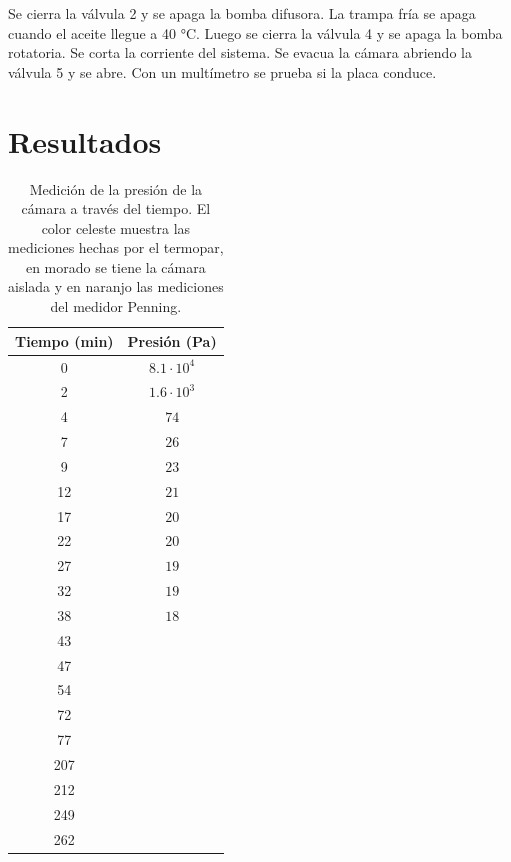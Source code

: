 \documentclass[journal]{IEEEtran}
\begin{document}
Se cierra la válvula 2 y se apaga la bomba difusora. La trampa fría se apaga cuando el aceite llegue a 40 °C. 
Luego se cierra la válvula 4 y se apaga la bomba rotatoria. Se corta la corriente del sistema.
Se evacua la cámara abriendo la válvula 5 y se abre. Con un multímetro se prueba si la placa conduce.


\section{Resultados}
\begin{table}[H]
\centering
\begin{tabular}{|c|c|}
\hline
\textbf{Tiempo (min)} & \textbf{Presión  (Pa)} \\ \hline
0 & \cellcolor[HTML]{38FFF8}$8.1\cdot 10^{4}$ \\ \hline
2 & \cellcolor[HTML]{38FFF8}$1.6\cdot 10^3$ \\ \hline
4 & \cellcolor[HTML]{38FFF8}$74$ \\ \hline
7 & \cellcolor[HTML]{38FFF8}$26$ \\ \hline
9 & \cellcolor[HTML]{38FFF8}$23$ \\ \hline
12 & \cellcolor[HTML]{38FFF8}$21$ \\ \hline
17 & \cellcolor[HTML]{38FFF8}$20$ \\ \hline
22 & \cellcolor[HTML]{38FFF8}$20$  \\ \hline
27 & \cellcolor[HTML]{38FFF8}$19$ \\ \hline
32 & \cellcolor[HTML]{38FFF8}$19 $ \\ \hline
38 & \cellcolor[HTML]{38FFF8}$18 $ \\ \hline
43 & \cellcolor[HTML]{38FFF8}{\color[HTML]{000000} $18$} \\ \hline
47 & \cellcolor[HTML]{38FFF8}{\color[HTML]{000000} $18 $} \\ \hline
54 & \cellcolor[HTML]{38FFF8}{\color[HTML]{000000} $17 $} \\ \hline
72 & \cellcolor[HTML]{CD84B0}{\color[HTML]{000000} $36$} \\ \hline
77 & \cellcolor[HTML]{38FFF8}{\color[HTML]{000000} $18$} \\ \hline
207 & \cellcolor[HTML]{38FFF8}{\color[HTML]{000000} $27 $} \\ \hline
212 & \cellcolor[HTML]{F8A102}{\color[HTML]{000000} $2.30 \cdot 10^{-1}$} \\ \hline
249 & \cellcolor[HTML]{F8A102}{\color[HTML]{000000} $2.1 \cdot 10^{-2}$} \\ \hline
262 & \cellcolor[HTML]{F8A102}{\color[HTML]{000000} $2.0 \cdot 10^{-2}$} \\ \hline
\end{tabular}
\caption{Medición de la presión de la cámara a través del tiempo. El color celeste muestra las mediciones hechas por el termopar, en morado se tiene la cámara aislada y en naranjo las mediciones del medidor Penning.}
\label{tabla con colores}
\end{table}
 
\end{document}
